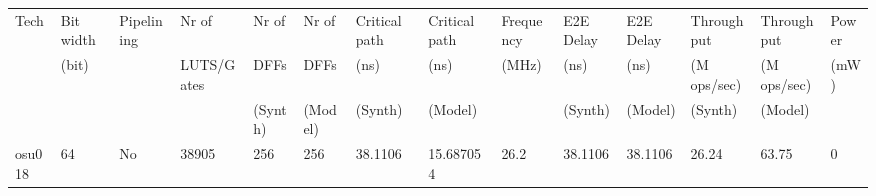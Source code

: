 \begin{tabular}{llllllllllllll}
\hline
\hline
 {Tech}   & {Bit width} & {Pipelining} & {Nr of}      & {Nr of}   & {Nr of}   & {Critical path} & {Critical path} & {Frequency} & {E2E Delay} & {E2E Delay} & {Throughput}  & {Throughput}  & {Power} \\
          & {(bit)}     &              & {LUTS/Gates} & {DFFs}    & {DFFs}    & {(ns)}          & {(ns)}          & {(MHz)}     & {(ns)}      & {(ns)}      & {(M ops/sec)} & {(M ops/sec)} & {(mW)}  \\
          &             &              &              & {(Synth)} & {(Model)} & {(Synth)}       & {(Model)}       &             & {(Synth)}   & {(Model)}   & {(Synth)}     & {(Model)}     &         \\
 {osu018} & 64          & {No}         & 38905        & 256       & 256       & 38.1106         & 15.687054       & 26.2        & 38.1106     & 38.1106     & 26.24         & 63.75         & 0       \\
\hline
\end{tabular}
